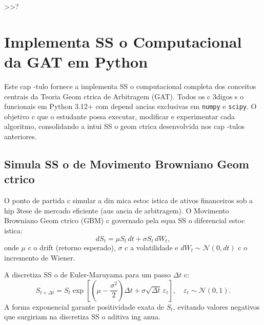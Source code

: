  >>?\chapter{Implementa SS o Computacional da GAT em Python}
\label{ch:implementacao-computacional}

Este cap -tulo fornece a implementa SS o computacional completa dos conceitos centrais da Teoria Geom ctrica de Arbitragem (GAT). Todos os c 3digos s o funcionais em Python 3.12+ com depend ancias exclusivas em \texttt{numpy} e \texttt{scipy}. O objetivo c que o estudante possa executar, modificar e experimentar cada algoritmo, consolidando a intui SS o geom ctrica desenvolvida nos cap -tulos anteriores.

\section{Simula SS o de Movimento Browniano Geom ctrico}
\label{sec:simulacao-gbm}

O ponto de partida c simular a din mica estoc istica de ativos financeiros sob a hip 3tese de mercado eficiente (aus ancia de arbitragem). O Movimento Browniano Geom ctrico (GBM) c governado pela equa SS o diferencial estoc istica:
\begin{equation}
 dS_t = \mu S_t\,dt + \sigma S_t\,dW_t,
\end{equation}
onde \(\mu\) c o drift (retorno esperado), \(\sigma\) c a volatilidade e \(dW_t \sim \mathcal{N}(0, dt)\) c o incremento de Wiener.

A discretiza SS o de Euler-Maruyama para um passo \(\Delta t\) c:
\begin{equation}
 S_{t+\Delta t} = S_t \exp\!\left[\left(\mu - \frac{\sigma^2}{2}\right)\Delta t + \sigma\sqrt{\Delta t}\,\varepsilon_t\right], \quad \varepsilon_t \sim \mathcal{N}(0,1).
\end{equation}
A forma exponencial garante positividade exata de \(S_t\), evitando valores negativos que surgiriam na discretiza SS o aditiva ing anua.

